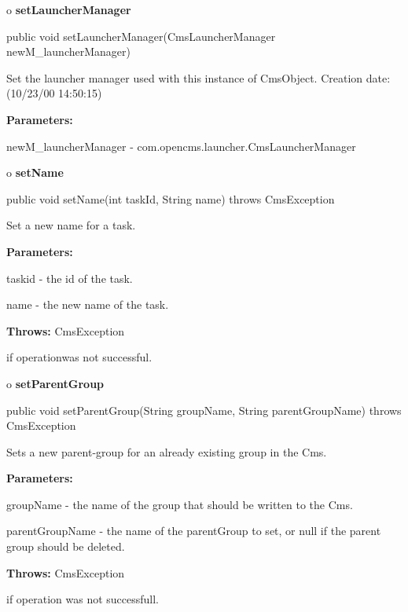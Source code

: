 o {\bf setLauncherManager} 

\begin{PRE}
 public void setLauncherManager(CmsLauncherManager newM\_launcherManager)
\end{PRE}

\begin{description}
\htmlDD Set the launcher manager used with this instance of CmsObject.
Creation date: (10/23/00 14:50:15) 

\begin{description}
\item {\bf Parameters:}  

newM\_launcherManager - com.opencms.launcher.CmsLauncherManager  
\end{description}

\end{description}

o {\bf setName} 

\begin{PRE}
 public void setName(int taskId,
                     String name) throws CmsException
\end{PRE}

\begin{description}
\htmlDD Set a new name for a task. 

\begin{description}
\item {\bf Parameters:}  

taskid - the id of the task.  

name - the new name of the task.  
\item {\bf Throws:} CmsException  

if operationwas not successful.  
\end{description}

\end{description}

o {\bf setParentGroup} 

\begin{PRE}
 public void setParentGroup(String groupName,
                            String parentGroupName) throws CmsException
\end{PRE}

\begin{description}
\htmlDD Sets a new parent-group for an already existing group in the Cms. 

\begin{description}
\item {\bf Parameters:}  

groupName - the name of the group that should be written to the Cms.  

parentGroupName - the name of the parentGroup to set, or null if the parent
group should be deleted.  
\item {\bf Throws:} CmsException  

if operation was not successfull.  
\end{description}

\end{description}

